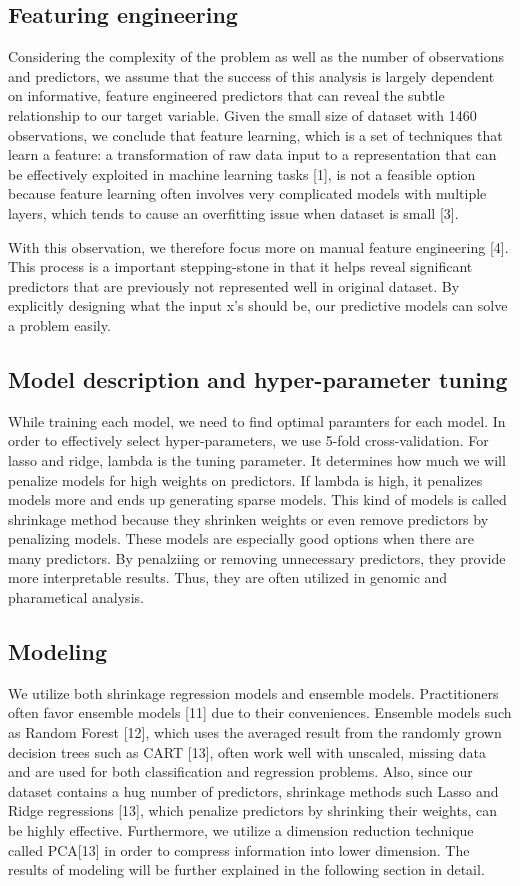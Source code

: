 \documentclass[letterpaper, 10 pt, conference]{ieeeconf}  %
\begin{document}
\subsection{Featuring engineering}

Considering the complexity of the problem as well as the number of observations and predictors, we assume that the success of this analysis is largely dependent on informative, feature engineered predictors that can reveal the subtle relationship to our target variable. Given the small size of dataset with 1460 observations, we conclude that feature learning, which is a set of techniques that learn a feature: a transformation of raw data input to a representation that can be effectively exploited in machine learning tasks [1], is not a feasible option because feature learning often involves very complicated models with multiple layers, which tends to cause an overfitting issue when dataset is small [3].

With this observation, we therefore focus more on manual feature engineering [4]. This process is a important stepping-stone in that it helps reveal significant predictors that are previously not represented well in original dataset. By explicitly designing what the input x's should be, our predictive models can solve a problem easily. 

\subsection{Model description and hyper-parameter tuning}
While training each model, we need to find optimal paramters for each model. In order to effectively select hyper-parameters, we use 5-fold cross-validation. For lasso and ridge, lambda is the tuning parameter. It determines how much we will penalize models for high weights on predictors. If lambda is high, it penalizes models more and ends up generating sparse models. This kind of models is called shrinkage method because they shrinken weights or even remove predictors by penalizing models. These models are especially good options when there are many predictors. By penalziing or removing unnecessary predictors, they provide more interpretable results. Thus, they are often utilized in genomic and pharametical analysis.

\subsection{Modeling}
We utilize both shrinkage regression models and ensemble models. Practitioners often favor ensemble models [11] due to their conveniences. Ensemble models such as Random Forest [12], which uses the averaged result from the randomly grown decision trees such as CART [13], often work well with unscaled, missing data and are used for both classification and regression problems. Also, since our dataset contains a hug number of predictors, shrinkage methods such Lasso and Ridge regressions [13], which penalize predictors by shrinking their weights, can be highly effective. Furthermore, we utilize a dimension reduction technique called PCA[13] in order to compress information into lower dimension. The results of modeling will be further explained in the following section in detail.
\end{document}

